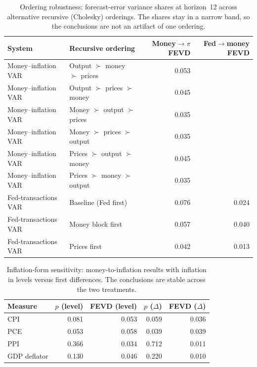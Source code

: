 \begin{table}[htbp]
\centering
\setlength{\belowcaptionskip}{8pt}
\small

\caption{Ordering robustness: forecast-error variance shares at horizon~12 across alternative recursive (Cholesky) orderings. The shares stay in a narrow band, so the conclusions are not an artifact of one ordering.}
\label{tab:ordering}
\begin{tabular}{llrr}
\toprule
System & Recursive ordering & Money$\to\pi$ FEVD & Fed$\to$money FEVD \\
\midrule
Money--inflation VAR & Output $\succ$ money $\succ$ prices & 0.053 &  \\
Money--inflation VAR & Output $\succ$ prices $\succ$ money & 0.045 &  \\
Money--inflation VAR & Money $\succ$ output $\succ$ prices & 0.035 &  \\
Money--inflation VAR & Money $\succ$ prices $\succ$ output & 0.035 &  \\
Money--inflation VAR & Prices $\succ$ output $\succ$ money & 0.045 &  \\
Money--inflation VAR & Prices $\succ$ money $\succ$ output & 0.035 &  \\
Fed-transactions VAR & Baseline (Fed first) & 0.076 & 0.024 \\
Fed-transactions VAR & Money block first & 0.057 & 0.040 \\
Fed-transactions VAR & Prices first & 0.042 & 0.013 \\
\bottomrule
\end{tabular}
\end{table}

\begin{table}[htbp]
\centering
\setlength{\belowcaptionskip}{8pt}
\small

\caption{Inflation-form sensitivity: money-to-inflation results with inflation in levels versus first differences. The conclusions are stable across the two treatments.}
\label{tab:inflform}
\begin{tabular}{lrrrr}
\toprule
Measure & $p$ (level) & FEVD (level) & $p$ ($\Delta$) & FEVD ($\Delta$) \\
\midrule
CPI & 0.081 & 0.053 & 0.059 & 0.036 \\
PCE & 0.053 & 0.058 & 0.039 & 0.039 \\
PPI & 0.366 & 0.034 & 0.712 & 0.011 \\
GDP deflator & 0.130 & 0.046 & 0.220 & 0.010 \\
\bottomrule
\end{tabular}
\end{table}

